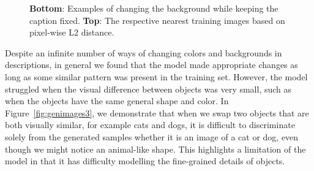 \documentclass{article} %
\begin{document}
\begin{figure}[!h]
\begin{center}
%
\quad
%
\end{center}
\caption{\textbf{Bottom}: Examples of changing the background while keeping the caption fixed. \textbf{Top}: The respective nearest training images based on pixel-wise L2 distance.}
\label{fig:genimages2}
\vspace{-0.3cm}
\end{figure}

Despite an infinite number of ways of changing colors and backgrounds in descriptions, in general we found that the model made appropriate changes as long as some similar pattern was present in the training set. However, the model struggled when the visual difference between objects was very small, such as when the objects have the same general shape and color. In Figure~\ref{fig:genimages3}, we demonstrate that when we swap two objects that are both visually similar, for example cats and dogs, it is difficult to discriminate solely from the generated samples whether it is an image of a cat or dog, even though we might notice an animal-like shape. This highlights a limitation of the model in that it has difficulty modelling the fine-grained details of objects. 
 
\end{document}
